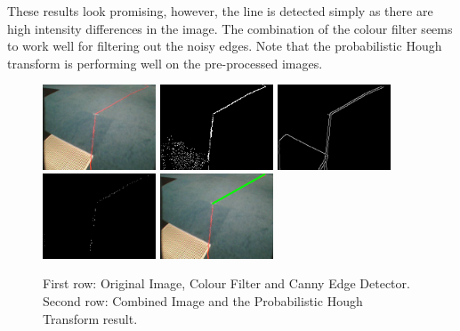 \documentclass[a4paper]{article}
\begin{document}
These results look promising, however, the line is detected simply as there are high intensity differences in the image. The combination of the colour filter seems to work well for filtering out the noisy edges. Note that the probabilistic Hough transform is performing well on the pre-processed images.
\begin{figure}[!ht]
\centering
\includegraphics[width=0.3\textwidth]{images/canny_image.png}
\includegraphics[width=0.3\textwidth]{images/canny_image_filter.png}
\includegraphics[width=0.3\textwidth]{images/canny_detector.png}\\
\includegraphics[width=0.3\textwidth]{images/canny_combine.png}
\includegraphics[width=0.3\textwidth]{images/canny_PHT.png}
\caption{First row: Original Image, Colour Filter and Canny Edge Detector. Second row: Combined Image and the Probabilistic Hough Transform result.}
\label{edge_detection_results}
\end{figure}
\end{document}
